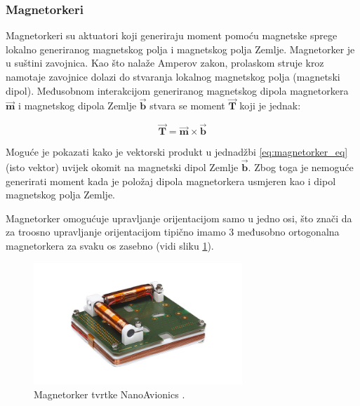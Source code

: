 \documentclass[times, utf8, diplomski, numeric]{templates/template}
\begin{document}
{{{            \subsubsection{Magnetorkeri }{
                Magnetorkeri su aktuatori koji generiraju moment pomoću magnetske sprege lokalno generiranog magnetskog polja i magnetskog polja Zemlje. Magnetorker je u suštini zavojnica. Kao što nalaže Amperov zakon, prolaskom struje kroz namotaje zavojnice dolazi do stvaranja lokalnog magnetskog polja (magnetski dipol). Međusobnom interakcijom generiranog magnetskog dipola magnetorkera $\overrightarrow{\boldsymbol{m}}$ i magnetskog dipola Zemlje $\overrightarrow{\boldsymbol{b}}$ stvara se moment $\overrightarrow{\boldsymbol{T}}$ koji je jednak:

                \begin{equation}
                    \label{eq:magnetorker_eq}
                    \overrightarrow{\boldsymbol{T}} = \overrightarrow{\boldsymbol{m}} \times \overrightarrow{\boldsymbol{b}}
                \end{equation}

                Moguće je pokazati kako je vektorski produkt u jednadžbi \ref{eq:magnetorker_eq} (isto vektor) uvijek okomit na magnetski dipol Zemlje $\overrightarrow{\boldsymbol{b}}$. Zbog toga je nemoguće generirati moment kada je položaj dipola magnetorkera usmjeren kao i dipol magnetskog polja Zemlje.

                Magnetorker omogućuje upravljanje orijentacijom samo u jedno osi, što znači da za troosno upravljanje orijentacijom tipično imamo 3 međusobno ortogonalna magnetorkera za svaku os zasebno (vidi sliku \ref{fig:magnetorquer_img}).

                \begin{figure}[htb]
                \centering
                \includegraphics[width=0.7\textwidth]{images/magnetorquer_img.jpg}
                \caption{Magnetorker tvrtke NanoAvionics \cite{magnetorquer_cite}.}
                \label{fig:magnetorquer_img}
                \end{figure}

}}}}
\end{document}
